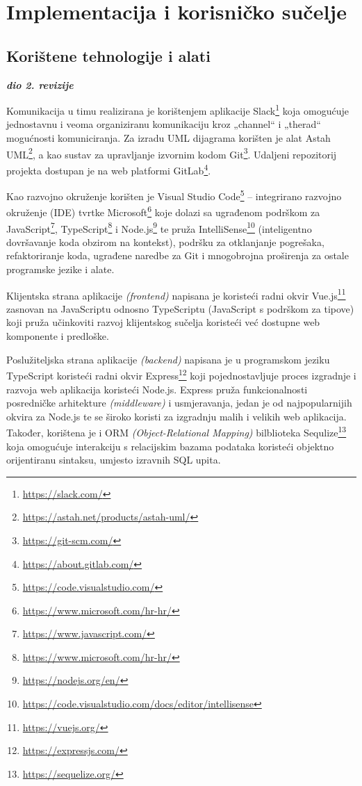 \chapter{Implementacija i korisničko sučelje}
		
		
		\section{Korištene tehnologije i alati}
		
			\textbf{\textit{dio 2. revizije}}
			
\noindent Komunikacija u timu realizirana je korištenjem aplikacije Slack\footnote{\url{https://slack.com/}} koja omogućuje jednostavnu i veoma organiziranu komunikaciju kroz „channel“ i „therad“ mogućnosti komuniciranja. Za izradu UML dijagrama korišten je alat Astah UML\footnote{\url{https://astah.net/products/astah-uml/}}, a kao sustav za upravljanje izvornim kodom Git\footnote{\url{https://git-scm.com/}}. Udaljeni repozitorij projekta dostupan je na web platformi GitLab\footnote{\url{https://about.gitlab.com/}}.

\noindent Kao razvojno okruženje korišten je Visual Studio Code\footnote{\url{https://code.visualstudio.com/}} – integrirano razvojno okruženje (IDE) tvrtke Microsoft\footnote{\url{https://www.microsoft.com/hr-hr/}} koje dolazi sa ugrađenom podrškom za JavaScript\footnote{\url{https://www.javascript.com/}}, TypeScript\footnote{\url{https://www.microsoft.com/hr-hr/}} i Node.js\footnote{\url{https://nodejs.org/en/}} te pruža IntelliSense\footnote{\url{https://code.visualstudio.com/docs/editor/intellisense}} (inteligentno dovršavanje koda obzirom na kontekst), podršku za otklanjanje pogrešaka, refaktoriranje koda, ugrađene naredbe za Git i mnogobrojna proširenja za ostale programske jezike i alate.

\noindent Klijentska strana aplikacije \textit{(frontend)} napisana je koristeći radni okvir Vue.js\footnote{\url{https://vuejs.org/}} zasnovan na JavaScriptu odnosno TypeScriptu (JavaScript s podrškom za tipove) koji pruža učinkoviti razvoj klijentskog sučelja koristeći već dostupne web komponente i predloške.

\noindent Poslužiteljska strana aplikacije \textit{(backend)} napisana je u programskom jeziku TypeScript koristeći radni okvir Express\footnote{\url{https://expressjs.com/}} koji pojednostavljuje proces izgradnje i razvoja web aplikacija koristeći Node.js. Express pruža funkcionalnosti posredničke arhitekture \textit{(middleware)} i usmjeravanja, jedan je od najpopularnijih okvira za Node.js te se široko koristi za izgradnju malih i velikih web aplikacija. Također, korištena je i ORM \textit{(Object-Relational Mapping)} bilblioteka Sequlize\footnote{\url{https://sequelize.org/}} koja omogućuje interakciju s relacijskim bazama podataka koristeći objektno orijentiranu sintaksu, umjesto izravnih SQL upita.

